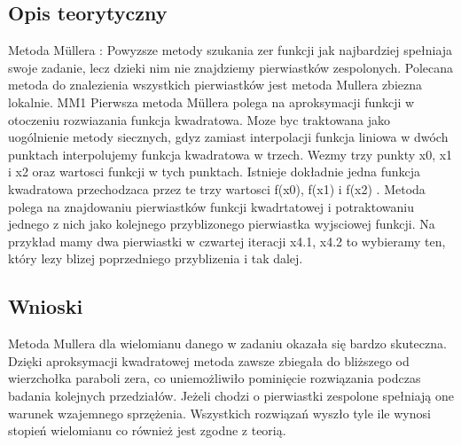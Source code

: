 \documentclass[11pt, oneside]{article}   	%
\begin{document}
\subsection{Opis teorytyczny}

Metoda Müllera : Powyzsze metody szukania zer funkcji jak najbardziej
spełniaja swoje zadanie, lecz dzieki nim nie znajdziemy pierwiastków zespolonych.
Polecana metoda do znalezienia wszystkich pierwiastków jest metoda
Mullera zbiezna lokalnie.
MM1 Pierwsza metoda Müllera polega na aproksymacji funkcji w otoczeniu
rozwiazania funkcja kwadratowa. Moze byc traktowana jako uogólnienie
metody siecznych, gdyz zamiast interpolacji funkcja liniowa w dwóch punktach
interpolujemy funkcja kwadratowa w trzech.
Wezmy trzy punkty x0, x1 i x2 oraz wartosci funkcji w tych punktach. Istnieje
dokładnie jedna funkcja kwadratowa przechodzaca przez te trzy wartosci
f(x0), f(x1) i f(x2) . Metoda polega na znajdowaniu pierwiastków funkcji
kwadrtatowej i potraktowaniu jednego z nich jako kolejnego przyblizonego
pierwiastka wyjsciowej funkcji. Na przykład mamy dwa pierwiastki w czwartej
iteracji x4.1, x4.2 to wybieramy ten, który lezy blizej poprzedniego przyblizenia
i tak dalej.

\subsection{Wnioski}
Metoda Mullera dla wielomianu danego w zadaniu okazała się bardzo skuteczna. Dzięki aproksymacji kwadratowej metoda zawsze zbiegała do bliższego od wierzchołka paraboli zera, co uniemożliwiło pominięcie rozwiązania podczas badania kolejnych przedziałów. Jeżeli chodzi o pierwiastki zespolone spełniają one warunek wzajemnego sprzężenia. Wszystkich rozwiązań wyszło tyle ile wynosi stopień wielomianu co również jest zgodne z teorią. 
\end{document}
